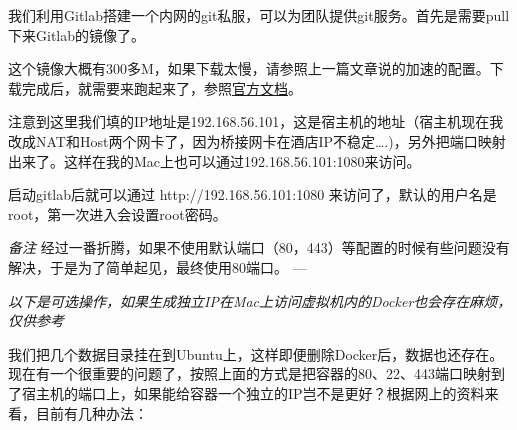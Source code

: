 \documentclass[12pt]{article}
\begin{document}
\makeblogtitle

我们利用Gitlab搭建一个内网的git私服，可以为团队提供git服务。首先是需要pull下来Gitlab的镜像了。

\begin{Shaded}
\begin{Highlighting}[]
\end{Highlighting}
\end{Shaded}

这个镜像大概有300多M，如果下载太慢，请参照上一篇文章说的加速的配置。下载完成后，就需要来跑起来了，参照\href{https://docs.gitlab.com/omnibus/docker/}{官方文档}。

\begin{Shaded}
\begin{Highlighting}[]
 \DataTypeTok{\textbackslash{}}
    \DataTypeTok{\textbackslash{}}
    \DataTypeTok{\textbackslash{}}
    \DataTypeTok{\textbackslash{}}
    \DataTypeTok{\textbackslash{}}
    \DataTypeTok{\textbackslash{}}
    \DataTypeTok{\textbackslash{}}
\end{Highlighting}
\end{Shaded}

注意到这里我们填的IP地址是192.168.56.101，这是宿主机的地址（宿主机现在我改成NAT和Host两个网卡了，因为桥接网卡在酒店IP不稳定\ldots.)，另外把端口映射出来了。这样在我的Mac上也可以通过192.168.56.101:1080来访问。

启动gitlab后就可以通过 http://192.168.56.101:1080 来访问了，默认的用户名是root，第一次进入会设置root密码。

\emph{备注} 经过一番折腾，如果不使用默认端口（80，443）等配置的时候有些问题没有解决，于是为了简单起见，最终使用80端口。 ---

\emph{以下是可选操作，如果生成独立IP在Mac上访问虚拟机内的Docker也会存在麻烦，仅供参考}

我们把几个数据目录挂在到Ubuntu上，这样即便删除Docker后，数据也还存在。现在有一个很重要的问题了，按照上面的方式是把容器的80、22、443端口映射到了宿主机的端口上，如果能给容器一个独立的IP岂不是更好？根据网上的资料来看，目前有几种办法：
\end{document}
